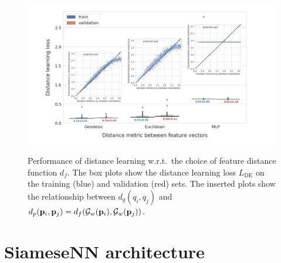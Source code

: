 \begin{figure}
    \centering
    \includegraphics[height=7cm]{figures/geo_eucl_mlp_distance_metric.pdf}
    \caption{
        Performance of distance learning w.r.t.\ the choice of feature distance function $d_f$.
        The box plots show the distance learning loss $L_\text{DE}$  on the training (blue) and validation (red) sets.
        The inserted plots show the relationship between $d_q(q_i, q_j)$ and $d_p(\mathbf{p}_i, \mathbf{p}_j) = d_f(\mathcal{G}_w(\mathbf{p}_i), \mathcal{G}_w(\mathbf{p}_j))$.
    }\label{fig:geo-eucl-mlp}
\end{figure}

\clearpage
\section{SiameseNN architecture}\label{apx:siamese-architecture}

